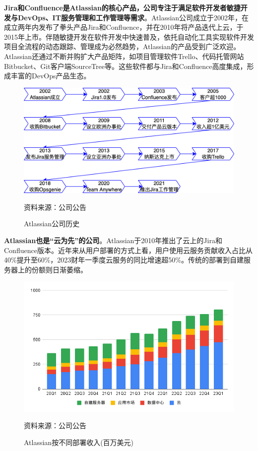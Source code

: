 \textbf{Jira和Confluence是Atlassian的核心产品，公司专注于满足软件开发者敏捷开发与DevOps、IT服务管理和工作管理等需求}。Atlassian公司成立于2002年，在成立两年内发布了拳头产品Jira和Confluence，并在2010年将产品迭代上云，于2015年上市。伴随敏捷开发在软件开发中快速普及，依托自动化工具实现软件开发项目全流程的动态跟踪、管理成为必然趋势，Atlassian的产品受到广泛欢迎。Atlassian还通过不断并购扩大产品矩阵，如项目管理软件Trello、代码托管网站Bitbucket、Git客户端SourceTree等。这些软件都与Jira和Confluence高度集成，形成丰富的DevOps产品生态。
\begin{figure}[H]
    \caption{Atlassian公司历史}
    \begin{center}
        \includegraphics[width=\linewidth]{img/timeline.drawio.png}
    \end{center}
    \footnotesize{资料来源：公司公告}
\end{figure}

\textbf{Atlassian也是“云为先”的公司}。Atlassian于2010年推出了云上的Jira和Confluence版本。近年来从用户部署的方式上看，用户使用云服务贡献收入占比从40\%提升至60\%，2023财年一季度云服务的同比增速超50\%。传统的部署到自建服务器上的份额则日渐萎缩。
\begin{figure}[H]
    \caption{Atlassian按不同部署收入(百万美元)}
    \begin{center}
        \includegraphics[width=0.8\linewidth]{img/deployment.png}
    \end{center}
    \footnotesize{资料来源：公司公告}
\end{figure}
